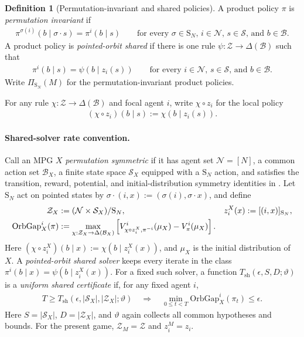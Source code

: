 \documentclass{article}
\theoremstyle{plain}
\theoremstyle{definition}
\newtheorem{definition}[theorem]{Definition}
\theoremstyle{remark}
\newcommand{\N}{\mathcal{N}}
\newcommand{\St}{\mathcal{S}}
\newcommand{\abs}[1]{\left\lvert#1\right\rvert}
\newcommand{\orbit}[1]{[#1]}
\newcommand{\Sym}{\mathrm{S}}
\begin{document}
\begin{definition}[Permutation-invariant and shared policies]
\label{def:permutation-invariant-policy}
A product policy $\pi$ is \emph{permutation invariant} if
\begin{align}
  \pi^{\sigma(i)}(b\mid\sigma\mathbin{\cdot}s)
  =
  \pi^i(b\mid s)
  \qquad
  \text{for every $\sigma\in\Sym_N$, $i\in\N$, $s\in\St$, and $b\in\mathcal B$.}
  \label{eq:perm-invariant-policy}
\end{align}
A product policy is \emph{pointed-orbit shared} if there is one rule
$\psi:\mathcal Z\to\Delta(\mathcal B)$ such that
\begin{align}
  \pi^i(b\mid s)
  =
  \psi(b\mid z_i(s))
  \qquad
  \text{for every $i\in\N$, $s\in\St$, and $b\in\mathcal B$.}
  \label{eq:shared-rule}
\end{align}
Write $\Pi_{\Sym_N}(M)$ for the permutation-invariant product policies.
\end{definition}

For any rule $\chi:\mathcal Z\to\Delta(\mathcal B)$ and focal agent $i$, write
$\chi\circ z_i$ for the local policy
\begin{align*}
  (\chi\circ z_i)(b\mid s)
  :=
  \chi(b\mid z_i(s)).
\end{align*}

\paragraph{Shared-solver rate convention.}
Call an MPG $X$ \emph{permutation symmetric} if it has agent set $\N=[N]$, a
common action set $\mathcal B_X$, a finite state space $\mathcal S_X$ equipped
with a $\Sym_N$ action, and satisfies the transition, reward, potential, and
initial-distribution symmetry identities in
. Let $\Sym_N$ act on pointed states by
$\sigma\mathbin{\cdot}(i,x):=(\sigma(i),\sigma\mathbin{\cdot}x)$, and define
\begin{align}
  \mathcal Z_X
  &:=
  (\N\times\mathcal S_X)/\Sym_N,&
  z_i^X(x)
  &:=
  \orbit{(i,x)}_{\Sym_N},
  \notag\\
  \mathrm{OrbGap}_X^i(\pi)
  &:=
  \max_{\chi:\mathcal Z_X\to\Delta(\mathcal B_X)}
  \left[
    V^i_{\chi\circ z_i^X,\pi^{-i}}(\mu_X)
    -
    V^i_\pi(\mu_X)
  \right].
  \label{eq:pointed-orbit-gap}
\end{align}
Here $(\chi\circ z_i^X)(b\mid x):=\chi(b\mid z_i^X(x))$, and $\mu_X$ is the
initial distribution of $X$.  A \emph{pointed-orbit shared solver} keeps every
iterate in the class
$\pi^i(b\mid x)=\psi(b\mid z_i^X(x))$.  For a fixed such solver, a function
$T_{\mathrm{sh}}(\epsilon,S,D;\vartheta)$ is a \emph{uniform shared
certificate} if, for any fixed agent $i$,
\begin{align}
  T\ge T_{\mathrm{sh}}\!\left(
    \epsilon,\abs{\mathcal S_X},\abs{\mathcal Z_X};\vartheta
  \right)
  \quad\Longrightarrow\quad
  \min_{0\le t<T}
  \mathrm{OrbGap}_X^i(\pi_t)\le\epsilon.
  \label{eq:uniform-shared-rate-profile}
\end{align}
Here $S=\abs{\mathcal S_X}$, $D=\abs{\mathcal Z_X}$, and $\vartheta$ again
collects all common hypotheses and bounds.  For the present game,
$\mathcal Z_M=\mathcal Z$ and $z_i^M=z_i$.
\end{document}
